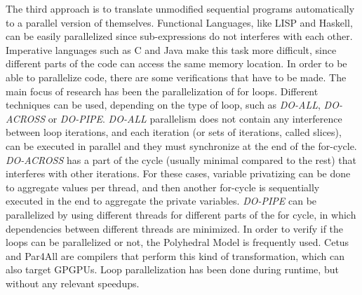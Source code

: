 \documentclass[smallextended]{svjour3}
\begin{document}
The third approach is to translate unmodified sequential programs automatically to a parallel version of themselves. Functional Languages, like LISP\cite{hogen1992automatic} and Haskell\cite{marlow2009runtime}, can be easily parallelized since sub-expressions do not interferes with each other. Imperative languages such as C and Java make this task more difficult, since different parts of the code can access the same memory location. In order to be able to parallelize code, there are some verifications that have to be made. The main focus of research has been the parallelization of for loops. Different techniques can be used, depending on the type of loop, such as \textit{DO-ALL}, \textit{DO-ACROSS} or \textit{DO-PIPE}. \textit{DO-ALL} parallelism does not contain any interference between loop iterations, and each iteration (or sets of iterations, called slices), can be executed in parallel and they must synchronize at the end of the for-cycle. \textit{DO-ACROSS} has a part of the cycle (usually minimal compared to the rest) that interferes with other iterations. For these cases, variable privatizing can be done to aggregate values per thread, and then another for-cycle is sequentially executed in the end to aggregate the private variables. \textit{DO-PIPE} can be parallelized by using different threads for different parts of the for cycle, in which dependencies between different threads are minimized. In order to verify if the loops can be parallelized or not, the Polyhedral Model is frequently used\cite{bondhugula2008automatic}. Cetus\cite{dave2009cetus} and Par4All\cite{amini2012par4all} are compilers that perform this kind of transformation, which can also target GPGPUs. Loop parallelization has been done during runtime\cite{zhao2005loop}, but without any relevant speedups.
\end{document}

